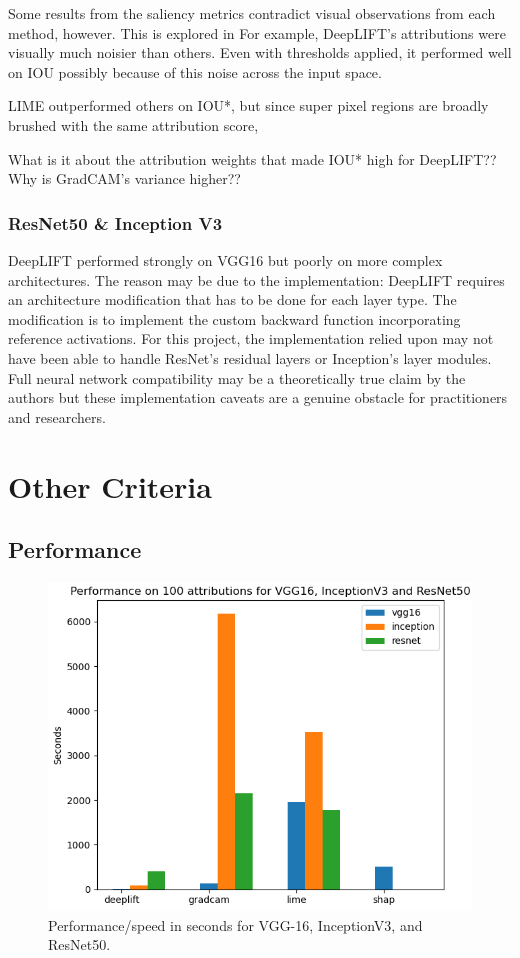 \documentclass[main]{subfiles}
\begin{document}
Some results from the saliency metrics contradict visual observations from each method, however. This is explored in  For example, DeepLIFT's attributions were visually much noisier than others. Even with thresholds applied, it performed well on IOU possibly because of this noise across the input space.


LIME outperformed others on IOU*, but since super pixel regions are broadly brushed with the same attribution score, 


What is it about the attribution weights that made IOU* high for DeepLIFT?? Why is GradCAM's variance higher??


\subsubsection{ResNet50 \& Inception V3}

DeepLIFT performed strongly on VGG16 but poorly on more complex architectures. The reason may be due to the implementation: DeepLIFT requires an architecture modification that has to be done for each layer type. The modification is to implement the custom backward function incorporating reference activations. For this project, the implementation relied upon may not have been able to handle ResNet's residual layers or Inception's layer modules. Full neural network compatibility may be a theoretically true claim by the authors but these implementation caveats are a genuine obstacle for practitioners and researchers.



\newpage
\section{Other Criteria}
\subsection{Performance} \label{sec:perform}


\begin{figure}[h]\centering
\vfill
\includegraphics[scale=0.6]{performance.png}
\caption{Performance/speed in seconds for VGG-16, InceptionV3, and ResNet50. }
\label{performFig}
\vfill
\end{figure}
\end{document}
